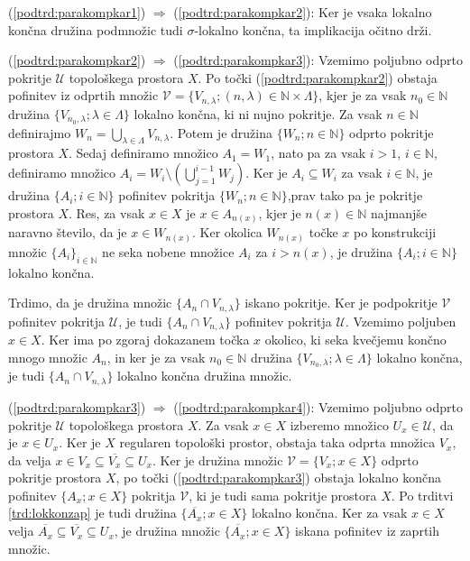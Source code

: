\documentclass[mat1]{fmfdelo}
\newcommand{\N}{\mathbb N}
\newcommand{\Ucurl}{\mathcal{U}}
\newcommand{\closure}[1]{\overline{#1}}
\begin{document}
\begin{dokaz}
(\ref{podtrd:parakompkar1}) $\Rightarrow$ (\ref{podtrd:parakompkar2}):
Ker je vsaka lokalno končna družina podmnožic tudi $\sigma$-lokalno končna, ta implikacija očitno drži.

(\ref{podtrd:parakompkar2}) $\Rightarrow$ (\ref{podtrd:parakompkar3}):
Vzemimo poljubno odprto pokritje $\Ucurl$ topološkega prostora $X$. Po točki (\ref{podtrd:parakompkar2}) obstaja pofinitev iz odprtih množic $\mathcal{V} = \lbrace V_{n,\lambda} ; (n, \lambda) \in \N \times \Lambda \rbrace$, kjer je za vsak $n_0 \in \N$ družina $\lbrace V_{n_0, \lambda} ; \lambda \in \Lambda\rbrace$ lokalno končna, ki ni nujno pokritje. Za vsak $n \in \N$ definirajmo $W_n = \bigcup_{\lambda \in \Lambda} V_{n, \lambda}$. Potem je družina $\lbrace W_n ; n \in \N \rbrace$ odprto pokritje prostora $X$. Sedaj definiramo množico $A_1 = W_1$, nato pa za vsak $i > 1$, $i \in \N$, definiramo množico $A_i = W_i \setminus (\bigcup_{j=1}^{i-1}W_j)$. Ker je $A_i \subseteq W_i$ za vsak $i \in \N$, je družina $\lbrace A_i ; i \in \N \rbrace$ pofinitev pokritja $\lbrace W_n ; n \in \N \rbrace$,prav tako pa je pokritje prostora $X$. Res, za vsak $x \in X$ je $x \in A_{n(x)}$, kjer je $n(x) \in \N$ najmanjše naravno število, da je $x \in W_{n(x)}$. Ker okolica $W_{n(x)}$ točke $x$ po konstrukciji množic $\lbrace A_i \rbrace_{i \in \N}$ ne seka nobene množice $A_i$ za $i > n(x)$, je družina $\lbrace A_i ; i \in \N \rbrace$ lokalno končna.

Trdimo, da je družina množic $\lbrace A_n \cap V_{n, \lambda}\rbrace$ iskano pokritje. Ker je podpokritje $\mathcal{V}$ pofinitev pokritja $\Ucurl$, je tudi $\lbrace A_n \cap V_{n, \lambda}\rbrace$ pofinitev pokritja $\Ucurl$. Vzemimo poljuben $x \in X$. Ker ima po zgoraj dokazanem točka $x$ okolico, ki seka kvečjemu končno mnogo množic $A_n$, in ker je za vsak $n_0 \in \N$ družina $\lbrace V_{n_0, \lambda} ; \lambda \in \Lambda \rbrace$ lokalno končna, je tudi $\lbrace A_n \cap V_{n, \lambda}\rbrace$ lokalno končna družina množic.

(\ref{podtrd:parakompkar3}) $\Rightarrow$ (\ref{podtrd:parakompkar4}):
Vzemimo poljubno odprto pokritje $\Ucurl$ topološkega prostora $X$. Za vsak $x \in X$ izberemo množico $U_x \in \Ucurl$, da je $x \in U_x$. Ker je $X$ regularen topološki prostor, obstaja taka odprta množica $V_x$, da velja $x \in V_x \subseteq \closure{V_x} \subseteq U_x$. Ker je družina množic $\mathcal{V} = \lbrace V_x ; x \in X \rbrace$ odprto pokritje prostora $X$, po točki (\ref{podtrd:parakompkar3}) obstaja lokalno končna pofinitev $\lbrace A_x ; x \in X \rbrace$ pokritja $\mathcal{V}$, ki je tudi sama pokritje prostora $X$. Po trditvi \ref{trd:lokkonzap} je tudi družina $\lbrace \closure{A_x} ; x \in X \rbrace$ lokalno končna. Ker za vsak $x \in X$ velja $\closure{A_x} \subseteq \closure{V_x} \subseteq U_x$, je družina množic $\lbrace \closure{A_x} ; x \in X \rbrace$ iskana pofinitev iz zaprtih množic.


\end{dokaz}
\end{document}
